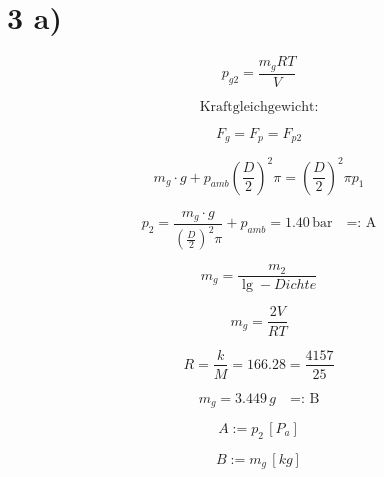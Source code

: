 \section*{3 a)}

\[
p_{g2} = \frac{m_g R T}{V}
\]

\[
\text{Kraftgleichgewicht:}
\]

\[
F_{g} = F_{p} = F_{p2}
\]

\[
m_g \cdot g + p_{amb} \left( \frac{D}{2} \right)^2 \pi = \left( \frac{D}{2} \right)^2 \pi p_1
\]

\[
p_2 = \frac{m_g \cdot g}{\left( \frac{D}{2} \right)^2 \pi} + p_{amb} = 1.40 \, \text{bar} \quad \text{=: A}
\]

\[
m_g = \frac{m_2}{\lg - Dichte}
\]

\[
m_g = \frac{2V}{R T}
\]

\[
R = \frac{k}{M} = 166.28 = \frac{4157}{25}
\]

\[
m_g = 3.449 \, g \quad \text{=: B}
\]

\[
A := p_2 \, [P_a]
\]

\[
B := m_g \, [kg]
\]